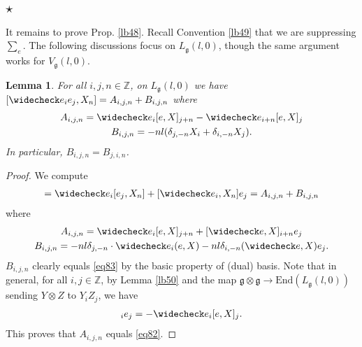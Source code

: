\documentclass[12pt,a4paper,notitlepage]{article}
\theoremstyle{definition}
\theoremstyle{plain}
\newtheorem{lm}[df]{Lemma}
\newcommand{\wch}{\widecheck}
\newcommand{\End}{\mathrm{End}} %
\newcommand{\gk}{\mathfrak g}
\newcommand{\Zbb}{\mathbb Z}
\numberwithin{equation}{section}
\begin{document}
\subsection{$\star$}


It remains to prove Prop. \ref{lb48}. Recall Convention \ref{lb49} that we are suppressing $\sum_e$. The following discussions focus on $L_\gk(l,0)$, though the same argument works for $V_\gk(l,0)$.

\begin{lm}\label{lb51}
For all $i,j,n\in\Zbb$, on $L_\gk(l,0)$ we have $[\wch e_ie_j,X_n]=A_{i,j,n}+B_{i,j,n}$ where
\begin{subequations}
\begin{gather}
A_{i,j,n}=\wch e_i[e,X]_{j+n}-\wch e_{i+n}[e,X]_j\label{eq82}\\
B_{i,j,n}=-nl(\delta_{j,-n}X_i+\delta_{i,-n}X_j).	\label{eq83}
\end{gather}
\end{subequations}
In particular, $B_{i,j,n}=B_{j,i,n}$.
\end{lm}

\begin{proof}
We compute
\begin{align*}
[\wch e_ie_j,X_n]=\wch e_i[e_j,X_n]+[\wch e_i,X_n]e_j=A_{i,j,n}+B_{i,j,n}	
\end{align*}	
where
\begin{gather*}
A_{i,j,n}=\wch e_i[e,X]_{j+n}+[\wch e,X]_{i+n}e_j\\
B_{i,j,n}=-nl \delta_{j,-n}\cdot \wch e_i(e,X)-nl\delta_{i,-n}(\wch e,X)e_j.	
\end{gather*}
$B_{i,j,n}$ clearly equals \eqref{eq83} by the basic property of (dual) basis. Note that in general, for all $i,j\in\Zbb$, by Lemma \ref{lb50} and the map $\gk\otimes\gk\rightarrow\End(L_\gk(l,0))$ sending $Y\otimes Z$ to $Y_iZ_j$, we have
\begin{align}
[\wch e,X]_ie_j=-\wch e_i[e,X]_j.\label{eq86}
\end{align}
This proves that $A_{i,j,n}$ equals \eqref{eq82}.
\end{proof}	
\end{document}
